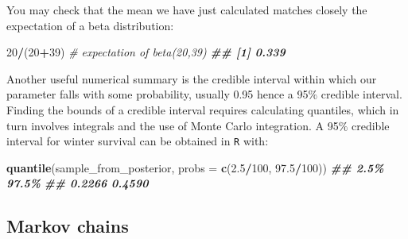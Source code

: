 \documentclass[
  12pt,
]{krantz}
\newenvironment{Shaded}{\begin{snugshade}}{\end{snugshade}}
\newcommand{\AttributeTok}[1]{\textcolor[rgb]{0.13,0.29,0.53}{#1}}
\newcommand{\CommentTok}[1]{\textcolor[rgb]{0.56,0.35,0.01}{\textit{#1}}}
\newcommand{\DecValTok}[1]{\textcolor[rgb]{0.00,0.00,0.81}{#1}}
\newcommand{\DocumentationTok}[1]{\textcolor[rgb]{0.56,0.35,0.01}{\textbf{\textit{#1}}}}
\newcommand{\FloatTok}[1]{\textcolor[rgb]{0.00,0.00,0.81}{#1}}
\newcommand{\FunctionTok}[1]{\textcolor[rgb]{0.13,0.29,0.53}{\textbf{#1}}}
\newcommand{\NormalTok}[1]{#1}
\newcommand{\SpecialCharTok}[1]{\textcolor[rgb]{0.81,0.36,0.00}{\textbf{#1}}}
\begin{document}
You may check that the mean we have just calculated matches closely the expectation of a beta distribution:

\begin{Shaded}
\begin{Highlighting}[]
\DecValTok{20}\SpecialCharTok{/}\NormalTok{(}\DecValTok{20}\SpecialCharTok{+}\DecValTok{39}\NormalTok{) }\CommentTok{\# expectation of beta(20,39)}
\DocumentationTok{\#\# [1] 0.339}
\end{Highlighting}
\end{Shaded}

Another useful numerical summary is the credible interval within which our parameter falls with some probability, usually 0.95 hence a 95\(\%\) credible interval. Finding the bounds of a credible interval requires calculating quantiles, which in turn involves integrals and the use of Monte Carlo integration. A 95\(\%\) credible interval for winter survival can be obtained in \texttt{R} with:

\begin{Shaded}
\begin{Highlighting}[]
\FunctionTok{quantile}\NormalTok{(sample\_from\_posterior, }\AttributeTok{probs =} \FunctionTok{c}\NormalTok{(}\FloatTok{2.5}\SpecialCharTok{/}\DecValTok{100}\NormalTok{, }\FloatTok{97.5}\SpecialCharTok{/}\DecValTok{100}\NormalTok{))}
\DocumentationTok{\#\#   2.5\%  97.5\% }
\DocumentationTok{\#\# 0.2266 0.4590}
\end{Highlighting}
\end{Shaded}

\subsection{Markov chains}\label{markovmodelmcmc}
\end{document}
